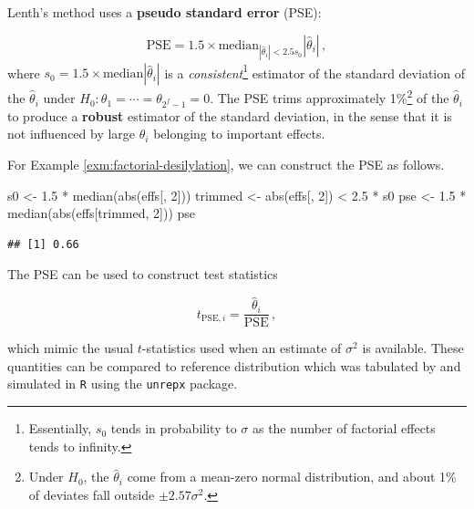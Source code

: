 \documentclass[
]{book}
\newenvironment{Shaded}{\begin{snugshade}}{\end{snugshade}}
\newcommand{\DecValTok}[1]{\textcolor[rgb]{0.00,0.00,0.81}{#1}}
\newcommand{\FloatTok}[1]{\textcolor[rgb]{0.00,0.00,0.81}{#1}}
\newcommand{\FunctionTok}[1]{\textcolor[rgb]{0.00,0.00,0.00}{#1}}
\newcommand{\NormalTok}[1]{#1}
\newcommand{\OtherTok}[1]{\textcolor[rgb]{0.56,0.35,0.01}{#1}}
\newcommand{\SpecialCharTok}[1]{\textcolor[rgb]{0.00,0.00,0.00}{#1}}
\theoremstyle{definition}
\theoremstyle{definition}
\theoremstyle{definition}
\theoremstyle{definition}
\theoremstyle{remark}
\begin{document}
Lenth's method uses a \textbf{pseudo standard error} (PSE):

\[
\mbox{PSE} = 1.5 \times \mbox{median}_{|\hat{\theta}_i| < 2.5s_0}|\hat{\theta}_i|\,,
\]
where \(s_0 = 1.5\times \mbox{median} |\hat{\theta}_i|\) is a \emph{consistent}\footnote{Essentially, \(s_0\) tends in probability to \(\sigma\) as the number of factorial effects tends to infinity.} estimator of the standard deviation of the \(\hat{\theta}_i\) under \(H_0: \theta_1 = \cdots=\theta_{2^f-1}=0\). The PSE trims approximately 1\%\footnote{Under \(H_0\), the \(\hat{\theta}_i\) come from a mean-zero normal distribution, and about 1\% of deviates fall outside \(\pm 2.57\sigma^2\).} of the \(\hat{\theta}_i\) to produce a \textbf{robust} estimator of the standard deviation, in the sense that it is not influenced by large \(\hat{\theta}_i\) belonging to important effects.

For Example \ref{exm:factorial-desilylation}, we can construct the PSE as follows.

\begin{Shaded}
\begin{Highlighting}[]
\NormalTok{s0 }\OtherTok{\textless{}{-}} \FloatTok{1.5} \SpecialCharTok{*} \FunctionTok{median}\NormalTok{(}\FunctionTok{abs}\NormalTok{(effs[, }\DecValTok{2}\NormalTok{]))}
\NormalTok{trimmed }\OtherTok{\textless{}{-}} \FunctionTok{abs}\NormalTok{(effs[, }\DecValTok{2}\NormalTok{]) }\SpecialCharTok{\textless{}} \FloatTok{2.5} \SpecialCharTok{*}\NormalTok{ s0}
\NormalTok{pse }\OtherTok{\textless{}{-}} \FloatTok{1.5} \SpecialCharTok{*} \FunctionTok{median}\NormalTok{(}\FunctionTok{abs}\NormalTok{(effs[trimmed, }\DecValTok{2}\NormalTok{]))}
\NormalTok{pse}
\end{Highlighting}
\end{Shaded}

\begin{verbatim}
## [1] 0.66
\end{verbatim}

The PSE can be used to construct test statistics

\[
t_{\mbox{PSE}, i} = \frac{\hat{\theta}_i}{\mbox{PSE}}\,,
\]

which mimic the usual \(t\)-statistics used when an estimate of \(\sigma^2\) is available. These quantities can be compared to reference distribution which was tabulated by \citet{Lenth1989} and simulated in \texttt{R} using the \texttt{unrepx} package.
\end{document}
